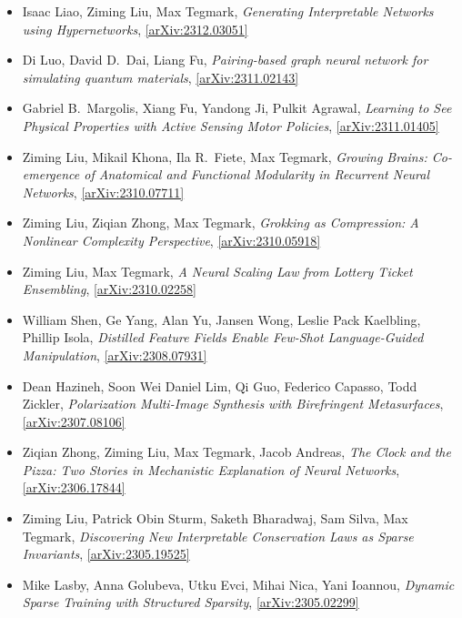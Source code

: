 \begin{itemize}
\item Isaac Liao, Ziming Liu, Max Tegmark, \textit{Generating Interpretable Networks using Hypernetworks}, \href{https://arxiv.org/abs/2312.03051}{[arXiv:2312.03051]} 
\item Di Luo, David D.\  Dai, Liang Fu, \textit{Pairing-based graph neural network for simulating quantum materials}, \href{https://arxiv.org/abs/2311.02143}{[arXiv:2311.02143]} 
\item Gabriel B.\  Margolis, Xiang Fu, Yandong Ji, Pulkit Agrawal, \textit{Learning to See Physical Properties with Active Sensing Motor Policies}, \href{https://arxiv.org/abs/2311.01405}{[arXiv:2311.01405]} 
\item Ziming Liu, Mikail Khona, Ila R.\  Fiete, Max Tegmark, \textit{Growing Brains: Co-emergence of Anatomical and Functional Modularity in Recurrent Neural Networks}, \href{https://arxiv.org/abs/2310.07711}{[arXiv:2310.07711]} 
\item Ziming Liu, Ziqian Zhong, Max Tegmark, \textit{Grokking as Compression: A Nonlinear Complexity Perspective}, \href{https://arxiv.org/abs/2310.05918}{[arXiv:2310.05918]} 
\item Ziming Liu, Max Tegmark, \textit{A Neural Scaling Law from Lottery Ticket Ensembling}, \href{https://arxiv.org/abs/2310.02258}{[arXiv:2310.02258]} 
\item William Shen, Ge Yang, Alan Yu, Jansen Wong, Leslie Pack Kaelbling, Phillip Isola, \textit{Distilled Feature Fields Enable Few-Shot Language-Guided Manipulation}, \href{https://arxiv.org/abs/2308.07931}{[arXiv:2308.07931]} 
\item Dean Hazineh, Soon Wei Daniel Lim, Qi Guo, Federico Capasso, Todd Zickler, \textit{Polarization Multi-Image Synthesis with Birefringent Metasurfaces}, \href{https://arxiv.org/abs/2307.08106}{[arXiv:2307.08106]} 
\item Ziqian Zhong, Ziming Liu, Max Tegmark, Jacob Andreas, \textit{The Clock and the Pizza: Two Stories in Mechanistic Explanation of Neural Networks}, \href{https://arxiv.org/abs/2306.17844}{[arXiv:2306.17844]} 
\item Ziming Liu, Patrick Obin Sturm, Saketh Bharadwaj, Sam Silva, Max Tegmark, \textit{Discovering New Interpretable Conservation Laws as Sparse Invariants}, \href{https://arxiv.org/abs/2305.19525}{[arXiv:2305.19525]} 
\item Mike Lasby, Anna Golubeva, Utku Evci, Mihai Nica, Yani Ioannou, \textit{Dynamic Sparse Training with Structured Sparsity}, \href{https://arxiv.org/abs/2305.02299}{[arXiv:2305.02299]} 

\end{itemize}
